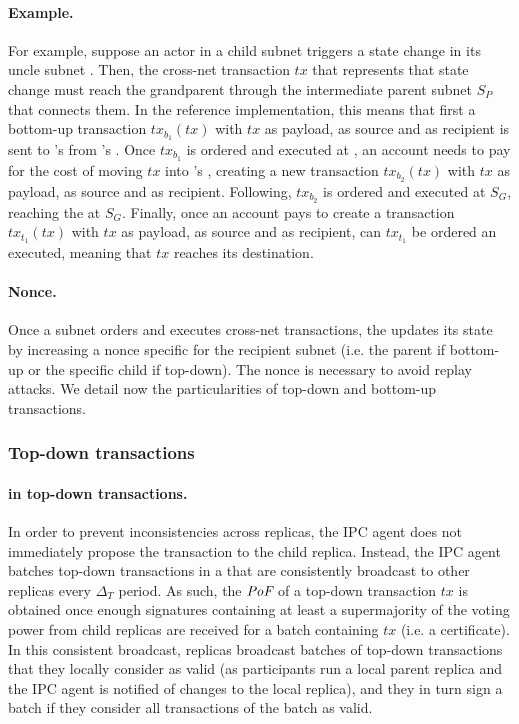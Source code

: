 \paragraph{Example.} For example, suppose an actor in a child subnet  triggers a state change in its uncle subnet . Then, the cross-net transaction $tx$ that represents that state change must reach the grandparent through the intermediate parent subnet $S_P$ that connects them. In the reference implementation, this means that first a bottom-up transaction $tx_{b_1}(tx)$ with $tx$ as payload,  as source and  as recipient is sent to 's \postoffice from 's \bqueue. Once $tx_{b_1}$ is ordered and executed at , an account needs to pay for the cost of moving $tx$ into 's \bqueue, creating a new transaction $tx_{b_2}(tx)$ with $tx$ as payload,  as source and  as recipient. Following, $tx_{b_2}$ is ordered and executed at $S_G$, reaching the \postoffice at $S_G$. Finally, once an account pays to create a transaction $tx_{t_1}(tx)$ with $tx$ as payload,  as source and  as recipient, can $tx_{t_1}$ be ordered an executed, meaning that $tx$ reaches its destination. 

\paragraph{Nonce.} Once a subnet orders and executes cross-net transactions, the \gw updates its state by increasing a nonce specific for the recipient subnet (i.e. the parent if bottom-up or the specific child if top-down). The nonce is necessary to avoid replay attacks. We detail now the particularities of top-down and bottom-up transactions. 

\subsubsection{Top-down transactions}

\paragraph{\pof in top-down transactions.} In order to prevent inconsistencies across replicas, the IPC agent does not immediately propose the transaction to the child replica. Instead, the IPC agent batches top-down transactions in a \emph{\tcheckpoint} that are consistently broadcast to other replicas every $\Delta_T$ period. As such, the $\textit{PoF}$ of a top-down transaction $tx$ is obtained once enough signatures containing at least a supermajority of the voting power from child replicas are received for a batch containing $tx$ (i.e. a certificate). In this consistent broadcast, replicas broadcast batches of top-down transactions that they locally consider as valid (as participants run a local parent replica and the IPC agent is notified of changes to the local replica), and they in turn sign a batch if they consider all transactions of the batch as valid. 

